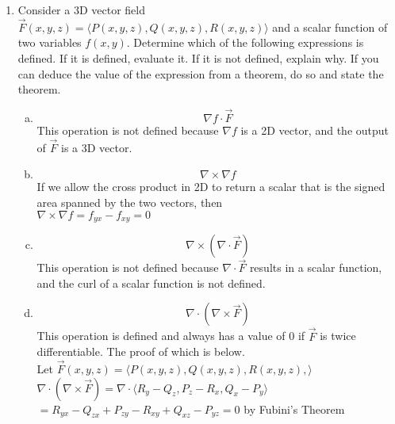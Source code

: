 \begin{enumerate}
	\item Consider a 3D vector field $\vec{F}(x,y,z)=\langle P(x,y,z),Q(x,y,z),R(x,y,z)\rangle$ and a scalar function of two variables $f(x,y)$. Determine which of the following expressions is defined. If it is defined, evaluate it. If it is not defined, explain why. If you can deduce the value of the expression from a theorem, do so and state the theorem.
	\begin{enumerate}[a.]
		\item $$\nabla f\cdot\vec{F}$$
		\indent
		This operation is not defined because $\nabla f$ is a 2D vector, and the output of $\vec{F}$ is a 3D vector.\\
		
		\item $$\nabla\times\nabla f$$
		\indent
		If we allow the cross product in 2D to return a scalar that is the signed area spanned by the two vectors, then\\
		$\nabla\times\nabla f=f_{yx}-f_{xy}=0$\\
		
		\item $$\nabla\times(\nabla\cdot\vec{F})$$
		\indent
		This operation is not defined because $\nabla\cdot\vec{F}$ results in a scalar function, and the curl of a scalar function is not defined.\\
		
		\item $$\nabla\cdot(\nabla\times\vec{F})$$
		\indent
		This operation is defined and always has a value of 0 if $\vec{F}$ is twice differentiable. The proof of which is below.\\
		Let $\vec{F}(x,y,z)=\langle P(x,y,z),Q(x,y,z),R(x,y,z),\rangle$\\
		$\nabla\cdot(\nabla\times\vec{F})=\nabla\cdot\langle R_y-Q_z,P_z-R_x,Q_x-P_y\rangle$\\
		$=R_{yx}-Q_{zx}+P_{zy}-R_{xy}+Q_{xz}-P_{yz}=0$ by Fubini's Theorem\\
	\end{enumerate}


\end{enumerate}
